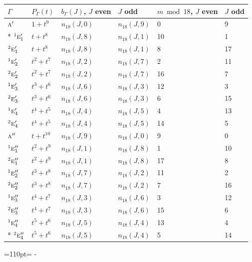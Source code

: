 \documentclass[10pt,a4paper]{article}
\newcommand{\needspace}[1]{\par\penalty-100\begingroup\dimen0=#1\relax\dimen2=\pagegoal
  \advance\dimen2-\pagetotal\ifdim\dimen0>\dimen2\relax\ifdim\dimen2>0pt\vfil\break\fi\fi
  \endgroup}
\numberwithin{equation}{section}
\newcommand{\irr}[1]{\text{\normalfont\scshape #1}}
\newcommand{\conjpair}[1]{{}^{#1}}
\begin{document}
{\small\begin{longtable}{@{}llllll@{}}\toprule
$\Gamma$ & $P_\Gamma(t)$ & $b_\Gamma(J)$, $J$ even & $J$ odd & $m \bmod 18$, $J$ even & $J$ odd\\\midrule\endhead
\bottomrule\endfoot\endlastfoot
$\irr{a}'$ & $1 + t^{9}$ & $n_{18}(J,0)$ & $n_{18}(J,9)$ & 0 & 9\\*
$\conjpair{1}\irr{e}_{1}'$ & $t + t^{8}$ & $n_{18}(J,8)$ & $n_{18}(J,1)$ & 10 & 1\\
$\conjpair{2}\irr{e}_{1}'$ & $t + t^{8}$ & $n_{18}(J,8)$ & $n_{18}(J,1)$ & 8 & 17\\
$\conjpair{1}\irr{e}_{2}'$ & $t^{2} + t^{7}$ & $n_{18}(J,2)$ & $n_{18}(J,7)$ & 2 & 11\\
$\conjpair{2}\irr{e}_{2}'$ & $t^{2} + t^{7}$ & $n_{18}(J,2)$ & $n_{18}(J,7)$ & 16 & 7\\
$\conjpair{1}\irr{e}_{3}'$ & $t^{3} + t^{6}$ & $n_{18}(J,6)$ & $n_{18}(J,3)$ & 12 & 3\\
$\conjpair{2}\irr{e}_{3}'$ & $t^{3} + t^{6}$ & $n_{18}(J,6)$ & $n_{18}(J,3)$ & 6 & 15\\
$\conjpair{1}\irr{e}_{4}'$ & $t^{4} + t^{5}$ & $n_{18}(J,4)$ & $n_{18}(J,5)$ & 4 & 13\\
$\conjpair{2}\irr{e}_{4}'$ & $t^{4} + t^{5}$ & $n_{18}(J,4)$ & $n_{18}(J,5)$ & 14 & 5\\
$\irr{a}''$ & $t + t^{10}$ & $n_{18}(J,9)$ & $n_{18}(J,0)$ & 9 & 0\\
$\conjpair{1}\irr{e}_{1}''$ & $t^{2} + t^{9}$ & $n_{18}(J,1)$ & $n_{18}(J,8)$ & 1 & 10\\
$\conjpair{2}\irr{e}_{1}''$ & $t^{2} + t^{9}$ & $n_{18}(J,1)$ & $n_{18}(J,8)$ & 17 & 8\\
$\conjpair{1}\irr{e}_{2}''$ & $t^{3} + t^{8}$ & $n_{18}(J,7)$ & $n_{18}(J,2)$ & 11 & 2\\
$\conjpair{2}\irr{e}_{2}''$ & $t^{3} + t^{8}$ & $n_{18}(J,7)$ & $n_{18}(J,2)$ & 7 & 16\\
$\conjpair{1}\irr{e}_{3}''$ & $t^{4} + t^{7}$ & $n_{18}(J,3)$ & $n_{18}(J,6)$ & 3 & 12\\
$\conjpair{2}\irr{e}_{3}''$ & $t^{4} + t^{7}$ & $n_{18}(J,3)$ & $n_{18}(J,6)$ & 15 & 6\\
$\conjpair{1}\irr{e}_{4}''$ & $t^{5} + t^{6}$ & $n_{18}(J,5)$ & $n_{18}(J,4)$ & 13 & 4\\*
$\conjpair{2}\irr{e}_{4}''$ & $t^{5} + t^{6}$ & $n_{18}(J,5)$ & $n_{18}(J,4)$ & 5 & 14\\
\bottomrule\end{longtable}}
\needspace{110pt}
\end{document}
